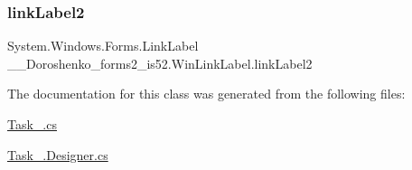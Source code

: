 \subsubsection{\texorpdfstring{link\+Label2}{linkLabel2}}
{\footnotesize\ttfamily System.\+Windows.\+Forms.\+Link\+Label \+\_\+\_\+\+Doroshenko\+\_\+forms2\+\_\+is52.\+Win\+Link\+Label.\+link\+Label2\hspace{0.3cm}{\ttfamily [private]}}



The documentation for this class was generated from the following files\+:\begin{DoxyCompactItemize}
\item 
\hyperlink{_task__6_8cs}{Task\+\_.\+cs}\item 
\hyperlink{_task__6_8_designer_8cs}{Task\+\_.\+Designer.\+cs}\end{DoxyCompactItemize}
